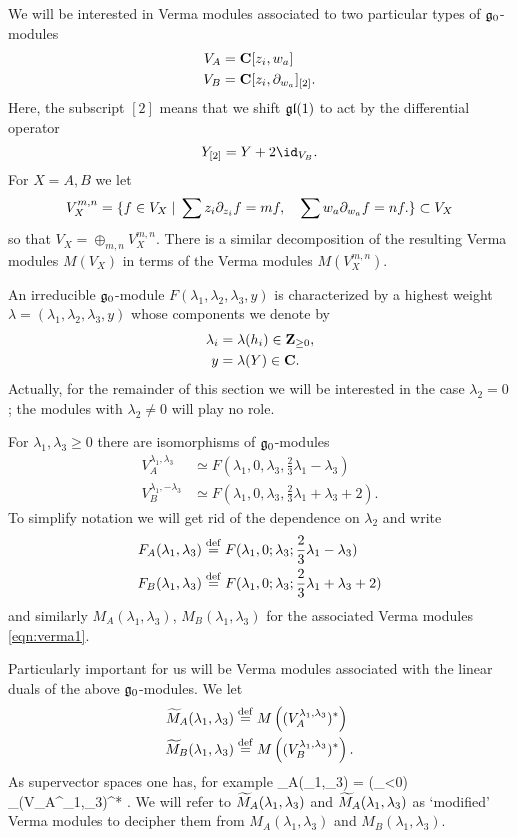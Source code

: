 \documentclass[11pt]{amsart}
\begin{document}
We will be interested in Verma modules associated to two particular types of $\mathfrak g_0$-modules
\begin{align*}
V_A & = \mathbf{C}[z_i, w_a] \\
V_B & = \mathbf{C}[z_i, \partial_{w_a}]_{[2]} .
\end{align*}
Here, the subscript $[2]$ means that we shift $\mathfrak{gl}(1)$ to act by the differential operator 
\[
Y_{[2]} = Y + 2 \id_{V_B} .
\]
For $X = A,B$ we let 
\[
V_X^{m,n} = \{f \in V_X \; | \; \sum z_i \partial_{z_i} f = m f , \quad \sum w_a \partial_{w_a} f = n f.\} \subset V_X
\]
so that $V_X = \oplus_{m,n} V_X^{m,n}$. 
There is a similar decomposition of the resulting Verma modules $M(V_X)$ in terms of the Verma modules $M(V_{X}^{m,n})$. 

An irreducible $\mathfrak g_0$-module $F(\lambda_1,\lambda_2,\lambda_3,y)$ is characterized by a highest weight $\lambda = (\lambda_1,\lambda_2,\lambda_3,y)$ whose components we denote by
\begin{align*}
\lambda_i & = \lambda (h_i) \in \mathbf{Z}_{\geq 0}, \\
 y & = \lambda(Y)\in \mathbf{C} . 
\end{align*}
Actually, for the remainder of this section we will be interested in the case $\lambda_2 = 0$; the modules with $\lambda_2 \ne 0$ will play no role.
 
For $\lambda_1,\lambda_3 \geq 0$ there are isomorphisms of $\mathfrak g_0$-modules
\begin{align*}
V_A^{\lambda_1,\lambda_3} & \simeq F(\lambda_1,0,\lambda_3,\frac23 \lambda_1 - \lambda_3) \\
V_B^{\lambda_1,-\lambda_3} & \simeq F(\lambda_1,0,\lambda_3,\frac23 \lambda_1 + \lambda_3 +2) .
\end{align*} 
To simplify notation we will get rid of the dependence on $\lambda_2$ and write 
\begin{align*}
F_A(\lambda_1,\lambda_3) & \overset{\rm def}{=} F(\lambda_1,0;\lambda_3;\frac23 \lambda_1 - \lambda_3) \\
F_B(\lambda_1,\lambda_3) & \overset{\rm def}{=} F(\lambda_1,0;\lambda_3;\frac23 \lambda_1 + \lambda_3 +2)  
\end{align*}
and similarly $M_A(\lambda_1,\lambda_3)$, $M_B(\lambda_1,\lambda_3)$ for the associated Verma modules \eqref{eqn:verma1}.

Particularly important for us will be Verma modules associated with the linear duals of the above $\mathfrak g_0$-modules.
We let 
\begin{align*}
\widetilde{M}_A(\lambda_1,\lambda_3) &\overset{\rm def}{=} M \left( (V_A^{\lambda_1,\lambda_3})^* \right) \\
\widetilde{M}_B(\lambda_1,\lambda_3) &\overset{\rm def}{=} M \left( (V_B^{\lambda_1,\lambda_3})^* \right) .
\end{align*}
As supervector spaces one has, for example
\beqn
{}_A(\lambda_1,\lambda_3) = \Sym(\fg_{<0}) \otimes_\C (V_A^{\lambda_1,\lambda_3})^* .
\eeqn
We will refer to $\widetilde{M}_A(\lambda_1,\lambda_3)$ and $\widetilde{M}_A (\lambda_1,\lambda_3)$ as `modified' Verma modules to decipher them from $M_A(\lambda_1,\lambda_3)$ and $M_B(\lambda_1,\lambda_3)$. 
\end{document}
